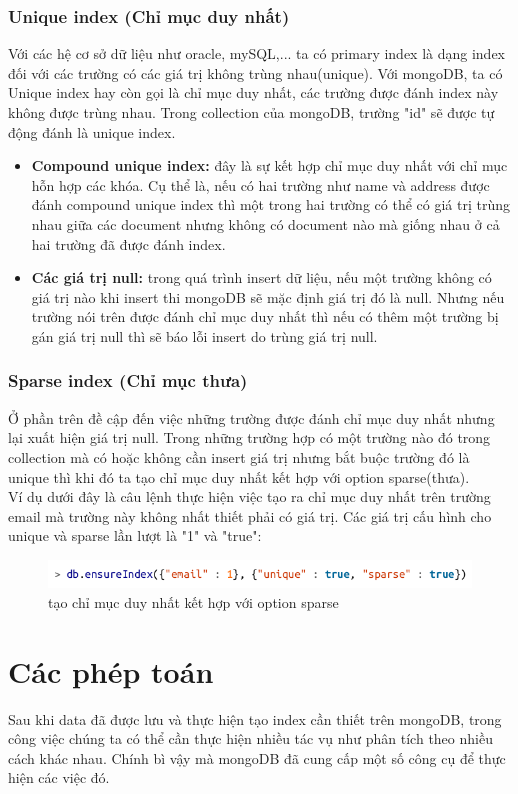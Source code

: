 \subsubsection{Unique index (Chỉ mục duy nhất)}
Với các hệ cơ sở dữ liệu như oracle, mySQL,... ta có primary index là dạng index đối với các trường có các giá trị không trùng nhau(unique). Với mongoDB, ta có Unique index hay còn gọi là chỉ mục duy nhất, các trường được đánh index này không được trùng nhau. Trong collection của mongoDB, trường "id" sẽ được tự động đánh là unique index.
\begin{itemize}
	\item \textbf{Compound unique index: }đây là sự kết hợp chỉ mục duy nhất với chỉ mục hỗn hợp các khóa. Cụ thể là, nếu có hai trường như name và address được đánh compound unique index thì một trong hai trường có thể có giá trị trùng nhau giữa các document nhưng không có document nào mà giống nhau ở cả hai trường đã được đánh index.
	\item \textbf{Các giá trị null: }trong quá trình insert dữ liệu, nếu một trường không có giá trị nào khi insert thi mongoDB sẽ mặc định giá trị đó là null. Nhưng nếu trường nói trên được đánh chỉ mục duy nhất thì nếu có thêm một trường bị gán giá trị null thì sẽ báo lỗi insert do trùng giá trị null.
\end{itemize}
\subsubsection{Sparse index (Chỉ mục thưa)}
Ở phần trên đề cập đến việc những trường được đánh chỉ mục duy nhất nhưng lại xuất hiện giá trị null. Trong những trường hợp có một trường nào đó trong collection mà có hoặc không cần insert giá trị nhưng bắt buộc trường đó là unique thì khi đó ta tạo chỉ mục duy nhất kết hợp với option sparse(thưa).\\
Ví dụ dưới đây là câu lệnh thực hiện việc tạo ra chỉ mục duy nhất trên trường email mà trường này không nhất thiết phải có giá trị. Các giá trị cấu hình cho unique và sparse lần lượt là "1" và "true":
\begin{figure}[h!]
		\centering
		\includegraphics[scale=0.5]{charts/sparse.png}
		\caption{tạo chỉ mục duy nhất kết hợp với option sparse}
		\label{fig:spindex}
\end{figure}

\section{Các phép toán}
Sau khi data đã được lưu và thực hiện tạo index cần thiết trên mongoDB, trong công việc chúng ta có thể cần thực hiện nhiều tác vụ như phân tích theo nhiều cách khác nhau. Chính bì vậy mà mongoDB đã cung cấp một số công cụ để thực hiện các việc đó.\\
